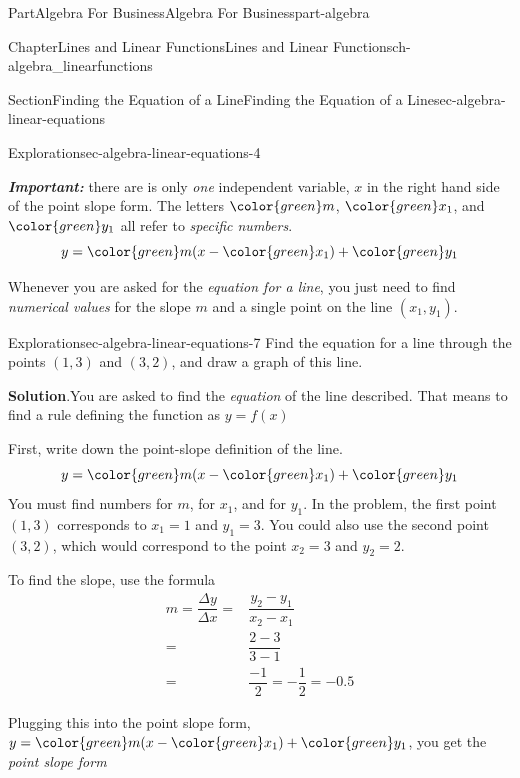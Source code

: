 \documentclass[oneside,10pt,]{tufte-book}
\newcommand{\blocktitlefont}{\relax}
\newcommand{\alert}[1]{\textbf{\textit{#1}}}
\numberwithin{equation}{chapter}
\newcommand{\amp}{&}
\begin{document}
\begin{partptx}{Part}{Algebra For Business}{}{Algebra For Business}{}{}{part-algebra}
\begin{chapterptx}{Chapter}{Lines and Linear Functions}{}{Lines and Linear Functions}{}{}{ch-algebra_linearfunctions}
\begin{sectionptx}{Section}{Finding the Equation of a Line}{}{Finding the Equation of a Line}{}{}{sec-algebra-linear-equations}
\begin{exploration}{Exploration}{}{sec-algebra-linear-equations-4}
\begin{image}{0.25}{0.5}{0.25}{}
{
}%
\end{image}%
\end{exploration}%
\alert{Important:} there are is only \emph{one} independent variable, \(x\) in the right hand side of the point slope form. The letters \(\color{green} m\), \(\color{green} x_1\), and \(\color{green} y_1\) all refer to \emph{specific numbers}.%
\begin{equation*}
y = {\color{green} m} (x - { \color{green} x_1}) + {\color{green} y_1}
\end{equation*}
%
\par
Whenever you are asked for the \emph{equation for a line}, you just need to find \emph{numerical values} for the slope \(m\) and a single point on the line \((x_1,y_1)\).%
\begin{exploration}{Exploration}{}{sec-algebra-linear-equations-7}%
Find the equation for a line through the points \((1,3)\) and \((3,2)\), and draw a graph of this line.%
\par\smallskip%
\noindent\textbf{\blocktitlefont Solution}.\hypertarget{sec-algebra-linear-equations-7-2}{}\quad{}You are asked to find the \emph{equation} of the line described. That means to find a rule defining the function as \(y = f(x)\)%
\par
First, write down the point-slope definition of the line.%
\begin{equation*}
y = {\color{green} m} (x - { \color{green} x_1}) + {\color{green} y_1}
\end{equation*}
You must find numbers for \(m\), for \(x_1\), and for \(y_1\). In the problem, the first point \((1,3)\) corresponds to \(x_1=1\) and \(y_1=3\).  You could also use the second point \((3,2)\), which would correspond to the point \(x_2=3\) and \(y_2 = 2\).%
\par
To find the slope, use the formula%
\begin{align*}
m = \dfrac{\Delta y}{\Delta x} = \amp \dfrac{y_2-y_1}{x_2-x_1}\\
= \amp \dfrac{2-3}{3-1}\\
= \amp \dfrac {-1}{2} = - \dfrac{1}{2} = -0.5 
\end{align*}
%
\par
Plugging this into the point slope form, \(y = {\color{green} m} (x - { \color{green} x_1}) + {\color{green} y_1}\), you get the \emph{point slope form}%

\end{exploration}
\end{sectionptx}
\end{chapterptx}
\end{partptx}
\end{document}
